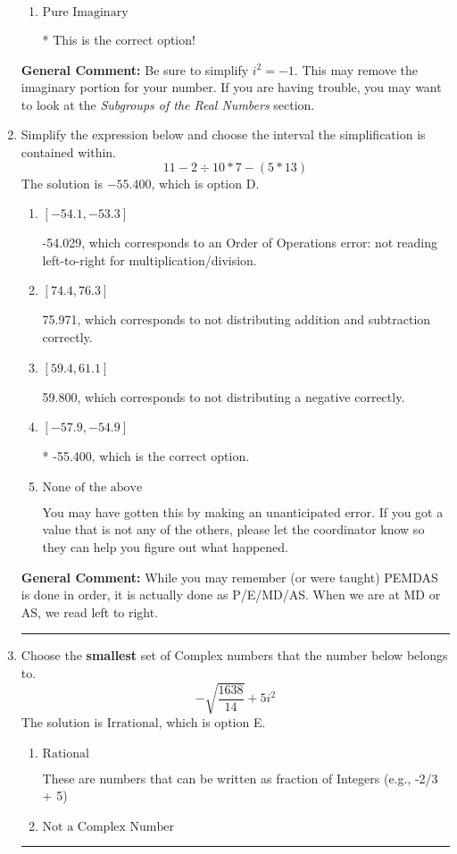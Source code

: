 \documentclass{extbook}[14pt]
\newcommand{\litem}[1]{\item #1

\rule{\textwidth}{0.4pt}}
\begin{document}
\begin{enumerate}
{\begin{enumerate}[label=\Alph*.]
This is a Complex number $(a+bi)$ that is not Real (has $i$ as part of the number).
\item \( \text{Pure Imaginary} \)

* This is the correct option!
\end{enumerate}

\textbf{General Comment:} Be sure to simplify $i^2 = -1$. This may remove the imaginary portion for your number. If you are having trouble, you may want to look at the \textit{Subgroups of the Real Numbers} section.
}
\litem{
Simplify the expression below and choose the interval the simplification is contained within.
\[ 11 - 2 \div 10 * 7 - (5 * 13) \]The solution is \( -55.400 \), which is option D.\begin{enumerate}[label=\Alph*.]
\item \( [-54.1, -53.3] \)

 -54.029, which corresponds to an Order of Operations error: not reading left-to-right for multiplication/division.
\item \( [74.4, 76.3] \)

 75.971, which corresponds to not distributing addition and subtraction correctly.
\item \( [59.4, 61.1] \)

 59.800, which corresponds to not distributing a negative correctly.
\item \( [-57.9, -54.9] \)

* -55.400, which is the correct option.
\item \( \text{None of the above} \)

 You may have gotten this by making an unanticipated error. If you got a value that is not any of the others, please let the coordinator know so they can help you figure out what happened.
\end{enumerate}

\textbf{General Comment:} While you may remember (or were taught) PEMDAS is done in order, it is actually done as P/E/MD/AS. When we are at MD or AS, we read left to right.
}
\litem{
Choose the \textbf{smallest} set of Complex numbers that the number below belongs to.
\[ -\sqrt{\frac{1638}{14}}+5i^2 \]The solution is \( \text{Irrational} \), which is option E.\begin{enumerate}[label=\Alph*.]
\item \( \text{Rational} \)

These are numbers that can be written as fraction of Integers (e.g., -2/3 + 5)
\item \( \text{Not a Complex Number} \)


\end{enumerate}}
\end{enumerate}
\end{document}
